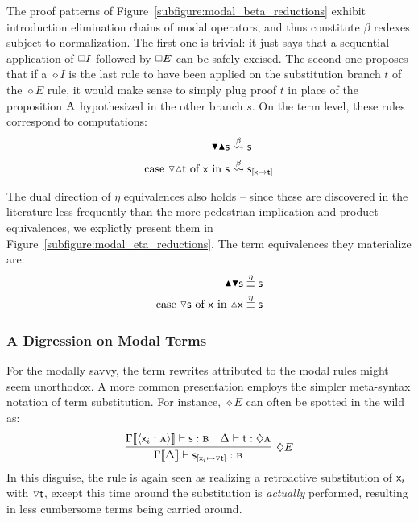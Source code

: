 The proof patterns of Figure~\ref{subfigure:modal_beta_reductions} exhibit introduction elimination chains of modal operators, and thus constitute $\beta$ redexes subject to normalization.
The first one is trivial: it just says that a sequential application of $\bx I$ followed by $\bx E$ can be safely excised.
The second one proposes that if a $\diamond I$ is the last rule to have been applied on the substitution branch $t$ of the $\diamond E$ rule, it would make sense to simply plug proof $t$ in place of the proposition $\normalfont\textsc{A}$ hypothesized in the other  branch $s$.
On the term level, these rules correspond to computations:
\begin{align}
\boxelim \boxintro \term{s} & \bred \term{s}\\
\cterm{case \term{\diaelim \diaintro t} of \term{x} in \term{s}} & \bred \term{s}_{[\term{x} \mapsto \term{t}]}
\end{align}

The dual direction of $\eta$ equivalences also holds -- since these are discovered in the literature less frequently than the more pedestrian implication and product equivalences, we explictly present them in Figure~\ref{subfigure:modal_eta_reductions}.
The term equivalences they materialize are:
\begin{align}
\boxintro \boxelim \term{s} & \overset{\eta}{\equiv} \term{s}\\
\cterm{case \term{\diaelim{s}} of \term{x} in \term{\diaintro{x}}} & \overset{\eta}{\equiv} \term{s}
\end{align}

\subsubsection{A Digression on Modal Terms}
For the modally savvy, the term rewrites attributed to the modal rules might seem unorthodox.
A more common presentation employs the simpler meta-syntax notation of term substitution.
For instance, $\diamond E$ can often be spotted in the wild as:
\[
	\infer[\diamond E]{\Gamma\ctx{\Delta} \vdash \term{s}_{[\term{\vari }\mapsto\term{\diaelim t}]}: \prop{b}}{
		\Gamma\ctx{\bracket{\term{\vari }:\prop{a}}}\vdash\term{s}:\prop{b}
		&
		\Delta \vdash \term{t}:\diamond\prop{a}
	}
\]
In this disguise, the rule is again seen as realizing a retroactive substitution of $\mathsf{\mathsf{x}_{\mathnormal{i}} }$ with $\smallterm{\diaelim t}$, except this time around the substitution is \textit{actually} performed, resulting in less cumbersome terms being carried around.

